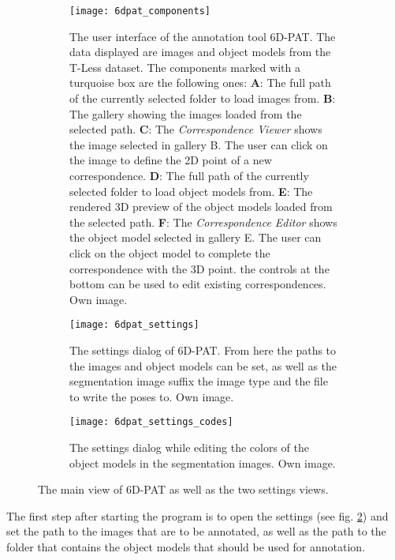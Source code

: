 \begin{figure}[!tbp]
	\centering
	\begin{subfigure}[t]{\textwidth}
		\centering
    	\texttt{[image: 6dpat\_components]}
    	\caption{The user interface of the annotation tool 6D-PAT. The data displayed are images and object models from the T-Less dataset. The components marked with a turquoise box are the following ones: \textbf{A}: The full path of the currently selected folder to load images from. \textbf{B}: The gallery showing the images loaded from the selected path. \textbf{C}: The \textit{Correspondence Viewer} shows the image selected in gallery B. The user can click on the image to define the 2D point of a new correspondence. \textbf{D}: The full path of the currently selected folder to load object models from. \textbf{E}: The rendered 3D preview of the object models loaded from the selected path. \textbf{F}: The \textit{Correspondence Editor} shows the object model selected in gallery E. The user can click on the object model to complete the correspondence with the 3D point. the controls at the bottom can be used to edit existing correspondences. Own image.}
    	\label{fig:6dpat_components}
	\end{subfigure}
	\par\bigskip
	\begin{subfigure}[t]{0.47\textwidth}
		\centering
    	\texttt{[image: 6dpat\_settings]}
    	\caption{The settings dialog of 6D-PAT. From here the paths to the images and object models can be set, as well as the segmentation image suffix the image type and the file to write the poses to. Own image.}
    	\label{fig:6dpat_settings}
	\end{subfigure}
	\hfill
	\begin{subfigure}[t]{0.47\textwidth}
	\centering
    	\texttt{[image: 6dpat\_settings\_codes]}
    	\caption{The settings dialog while editing the colors of the object models in the segmentation images. Own image.}
    	\label{fig:6dpat_settings_codes}
	\end{subfigure}
	\caption{The main view of 6D-PAT as well as the two settings views.}
	\label{fig:6dpat_ui_overview}
\end{figure}

The first step after starting the program is to open the settings (see fig. \ref{fig:6dpat_settings}) and set the path to the images that are to be annotated, as well as the path to the folder that contains the object models that should be used for annotation. 

